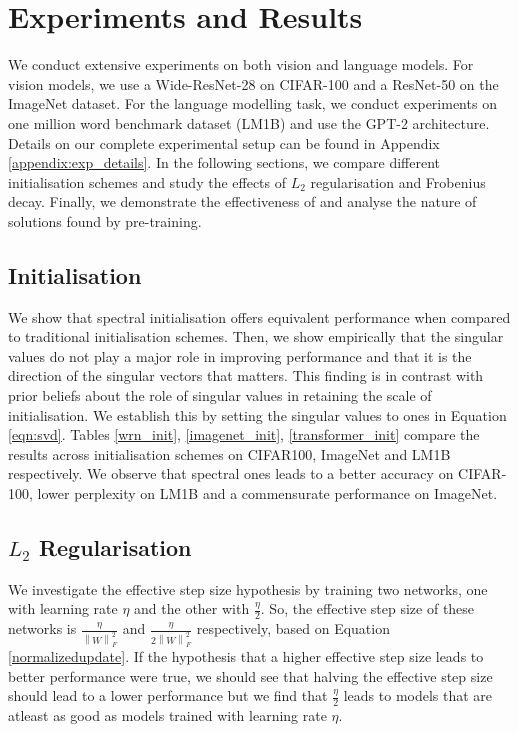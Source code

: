 \documentclass{article}
\newcommand{\norm}[2]{\left\lVert #1 \right\rVert_{#2}}
\begin{document}
\vspace{-2mm}
\section{Experiments and Results}
\label{sec:expts}
We conduct extensive experiments on both vision and language models. For vision models, we use a Wide-ResNet-28 \cite{wideresnet} on CIFAR-100 and a ResNet-50 \cite{resnet} on the ImageNet dataset. For the language modelling task, we conduct experiments on one million word benchmark dataset (LM1B) \cite{lm1b} and use the GPT-2 \cite{gpt2} architecture. Details on our complete experimental setup can be found in Appendix \ref{appendix:exp_details}. In the following sections, we compare different initialisation schemes and study the effects of $L_2$ regularisation and Frobenius decay. Finally, we demonstrate the effectiveness of \textemdash{}   and analyse the nature of solutions found by \textemdash{} pre-training.
\vspace{-2mm}
\subsection{Initialisation} \label{expt:init}
We show that spectral initialisation offers equivalent performance when compared to traditional initialisation schemes. Then, we show empirically that the singular values do not play a major role in improving performance and that it is the direction of the singular vectors that matters. This finding is in contrast with prior beliefs \cite{khodak2021initialization} about the role of singular values in retaining the scale of initialisation.  We establish this by setting the singular values to ones in Equation \ref{eqn:svd}.
Tables \ref{wrn_init}, \ref{imagenet_init}, \ref{transformer_init} compare the results across initialisation schemes on CIFAR100, ImageNet and LM1B respectively. We observe that spectral ones leads to a better accuracy on CIFAR-100, lower perplexity on LM1B and a commensurate performance on ImageNet. 



\subsection{$L_2$ Regularisation}

We investigate the effective step size hypothesis by training two networks, one with learning rate $\eta$ and the other with $\frac{\eta}{2}$. So, the effective step size of these networks is $\frac{\eta}{\norm{W}{F}^2}$ and $\frac{\eta}{2\norm{W}{F}^2}$ respectively, based on Equation \ref{normalizedupdate}. If the hypothesis that a higher effective step size leads to better performance were true, we should see that halving the effective step size should lead to a lower performance but we find that $\frac{\eta}{2}$ leads to models that are atleast as good as models trained with learning rate $\eta$.
\end{document}
